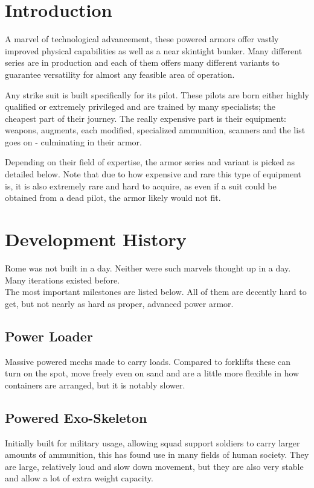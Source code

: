 \documentclass[12pt,a4paper,openany,usenames,dvipsnames]{book}
\begin{document}
	

	\chapter{Introduction}
	A marvel of technological advancement, these powered armors offer vastly improved physical capabilities as well as a near skintight bunker. Many different series are in production and each of them offers many different variants to guarantee versatility for almost any feasible area of operation.\par
	Any strike suit is built specifically for its pilot. These pilots are born either highly qualified or extremely privileged and are trained by many specialists; the cheapest part of their journey. The really expensive part is their equipment: weapons, augments, each modified, specialized ammunition, scanners and the list goes on - culminating in their armor.\par
	Depending on their field of expertise, the armor series and variant is picked as detailed below. Note that due to how expensive and rare this type of equipment is, it is also extremely rare and hard to acquire, as even if a suit could be obtained from a dead pilot, the armor likely would not fit.
	
	\chapter{Development History}
	Rome was not built in a day. Neither were such marvels thought up in a day. Many iterations existed before.
	\\%
	The most important milestones are listed below. All of them are decently hard to get, but not nearly as hard as proper, advanced power armor.
	\section{Power Loader}
	Massive powered mechs made to carry loads. Compared to forklifts these can turn on the spot, move freely even on sand and are a little more flexible in how containers are arranged, but it is notably slower.
	\par
	\section{Powered Exo-Skeleton}
	Initially built for military usage, allowing squad support soldiers to carry larger amounts of ammunition, this has found use in many fields of human society. They are large, relatively loud and slow down movement, but they are also very stable and allow a lot of extra weight capacity.
	\par
\end{document}
